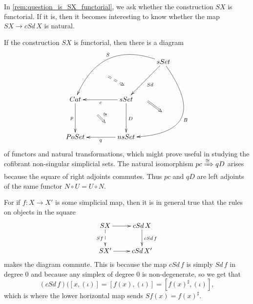 In \cref{rem:question_is_SX_functorial}, we ask whether the construction $SX$ is functorial. If it is, then it becomes interesting to know whether the map $SX\to cSd\, X$ is natural.
\begin{remark}\label{rem:question_is_comparison_SX_vs_cSdX_natural}
If the construction $SX$ is functorial, then there is a diagram
\begin{displaymath}
\xymatrix@=1em{
&&&&& sSet \ar@/_3pc/[lllllddd]_S \ar[llddd]^{Sd} \ar@/^5pc/[lldddddd]^B \\
&& \ar@{==>}[dr] \\
&&& \\
Cat \ar[ddd]_p &&& sSet \ar[lll]^c \ar[ddd]^D & \ar@{=>}[dr] \\
& \ar@{=>}[dr]^\cong &&&& \\
&& \\
PoSet &&& nsSet \ar[lll]^q
}
\end{displaymath}
of functors and natural transformations, which might prove useful in studying the cofibrant non-singular simplicial sets. The natural isomorphism $pc\xRightarrow{\cong } qD$ arises because the square of right adjoints commutes. Thus $pc$ and $qD$ are left adjoints of the same functor $N\circ U=U\circ N$.

For if $f:X\to X'$ is some simplicial map, then it is in general true that the rules on objects in the square
\begin{displaymath}
\xymatrix{
SX \ar@{-->}[d]_{Sf} \ar[r] & cSd\, X \ar[d]^{cSd\, f} \\
SX' \ar[r] & cSd\, X'
}
\end{displaymath}
makes the diagram commute. This is because the map $cSd\, f$ is simply $Sd\, f$ in degree $0$ and because any simplex of degree $0$ is non-degenerate, so we get that
\[(cSd\, f)([x,(\iota )]=[f(x),(\iota )]=[f(x)^\sharp ,(\iota )],\]
which is where the lower horizontal map sends $Sf(x)=f(x)^\sharp$.


\end{remark}
